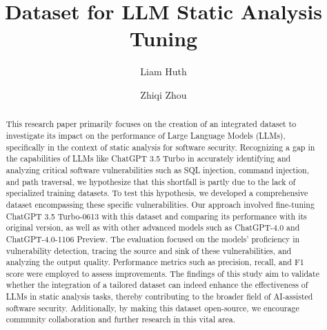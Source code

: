 \documentclass[acmsmall]{acmart}
\begin{document}
\title{Dataset for LLM Static Analysis Tuning}

\author{Liam Huth}
\author{Zhiqi Zhou}
\authornotemark[1]


\renewcommand{\shortauthors}{Liam Huth and Peter Zhou}

\begin{abstract}
  This research paper primarily focuses on the creation of an integrated dataset to investigate its impact on the performance of Large Language Models (LLMs), specifically in the context of static analysis for software security. Recognizing a gap in the capabilities of LLMs like ChatGPT 3.5 Turbo in accurately identifying and analyzing critical software vulnerabilities such as SQL injection, command injection, and path traversal, we hypothesize that this shortfall is partly due to the lack of specialized training datasets. To test this hypothesis, we developed a comprehensive dataset encompassing these specific vulnerabilities. Our approach involved fine-tuning ChatGPT 3.5 Turbo-0613 with this dataset and comparing its performance with its original version, as well as with other advanced models such as ChatGPT-4.0 and ChatGPT-4.0-1106 Preview. The evaluation focused on the models' proficiency in vulnerability detection, tracing the source and sink of these vulnerabilities, and analyzing the output quality. Performance metrics such as precision, recall, and F1 score were employed to assess improvements. The findings of this study aim to validate whether the integration of a tailored dataset can indeed enhance the effectiveness of LLMs in static analysis tasks, thereby contributing to the broader field of AI-assisted software security. Additionally, by making this dataset open-source, we encourage community collaboration and further research in this vital area.
\end{abstract}
\end{document}
